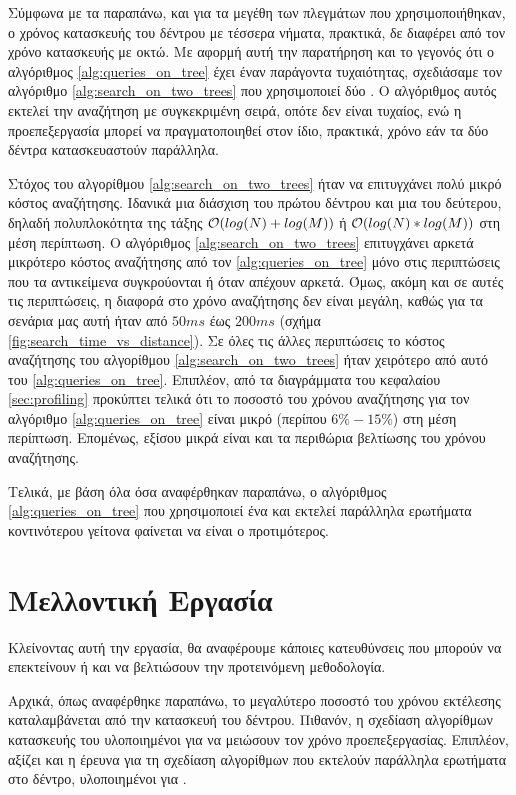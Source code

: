 Σύμφωνα με τα παραπάνω, και για τα μεγέθη των πλεγμάτων που χρησιμοποιήθηκαν, 
ο χρόνος κατασκευής του δέντρου με τέσσερα νήματα, πρακτικά, δε διαφέρει 
από τον χρόνο κατασκευής με οκτώ. 
Με αφορμή αυτή την παρατήρηση και το γεγονός ότι ο αλγόριθμος \ref{alg:queries_on_tree}
έχει έναν παράγοντα τυχαιότητας, σχεδιάσαμε τον αλγόριθμο \ref{alg:search_on_two_trees}
που χρησιμοποιεί δύο .
Ο αλγόριθμος αυτός εκτελεί την αναζήτηση με συγκεκριμένη σειρά, οπότε δεν είναι τυχαίος,
ενώ η προεπεξεργασία μπορεί να πραγματοποιηθεί στον ίδιο, πρακτικά, χρόνο εάν τα 
δύο δέντρα κατασκευαστούν παράλληλα.

Στόχος του αλγορίθμου \ref{alg:search_on_two_trees} ήταν να επιτυγχάνει πολύ 
μικρό κόστος αναζήτησης. 
Ιδανικά μια διάσχιση του πρώτου δέντρου και μια του δεύτερου, δηλαδή πολυπλοκότητα 
της τάξης $\mathcal{O}(log(N) + log(M))$ ή $\mathcal{O}(log(N) * log(M))$ στη 
μέση περίπτωση.
Ο αλγόριθμος \ref{alg:search_on_two_trees} επιτυγχάνει αρκετά μικρότερο κόστος 
αναζήτησης από τον \ref{alg:queries_on_tree} μόνο στις περιπτώσεις 
που τα αντικείμενα συγκρούονται ή όταν απέχουν αρκετά.
Όμως, ακόμη και σε αυτές τις περιπτώσεις, η διαφορά στο χρόνο αναζήτησης 
δεν είναι μεγάλη, καθώς για τα σενάρια μας αυτή 
ήταν από $50ms$ έως $200ms$ (σχήμα \ref{fig:search_time_vs_distance}).
Σε όλες τις άλλες περιπτώσεις το κόστος αναζήτησης του αλγορίθμου 
\ref{alg:search_on_two_trees} ήταν χειρότερο από αυτό του \ref{alg:queries_on_tree}.
Επιπλέον, από τα διαγράμματα του κεφαλαίου \ref{sec:profiling} προκύπτει τελικά 
ότι το ποσοστό του χρόνου αναζήτησης για τον αλγόριθμο \ref{alg:queries_on_tree}
είναι μικρό (περίπου $6\% - 15\%$) στη μέση περίπτωση.
Επομένως, εξίσου μικρά είναι και τα περιθώρια βελτίωσης του χρόνου αναζήτησης.

Τελικά, με βάση όλα όσα αναφέρθηκαν παραπάνω, ο αλγόριθμος \ref{alg:queries_on_tree} 
που χρησιμοποιεί ένα  και εκτελεί παράλληλα ερωτήματα κοντινότερου 
γείτονα φαίνεται να είναι ο προτιμότερος.


\section{Μελλοντική Εργασία}
Κλείνοντας αυτή την εργασία, θα αναφέρουμε κάποιες κατευθύνσεις που μπορούν 
να επεκτείνουν ή και να βελτιώσουν την προτεινόμενη μεθοδολογία.

Αρχικά, όπως αναφέρθηκε παραπάνω, το μεγαλύτερο ποσοστό του χρόνου εκτέλεσης 
καταλαμβάνεται από την κατασκευή του δέντρου. 
Πιθανόν, η σχεδίαση αλγορίθμων κατασκευής του  υλοποιημένοι 
για  να μειώσουν τον χρόνο προεπεξεργασίας.
Επιπλέον, αξίζει και η έρευνα για τη σχεδίαση αλγορίθμων που εκτελούν παράλληλα 
ερωτήματα στο δέντρο, υλοποιημένοι για .

